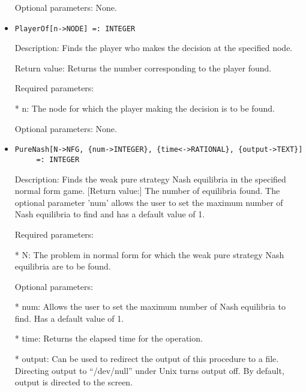 \begin{itemize}
\item
[Optional parameters:] None.
\ed

\item
\begin{verbatim}
PlayerOf[n->NODE] =: INTEGER
\end{verbatim}

\bd
\item
[Description:] Finds the player who makes the decision at the specified
node.
\item
[Return value:] Returns the number corresponding to the player found.
\item
[Required parameters:]\hfil\null

\bd
\item
[* n:] The node for which the player making the decision is to be
found.
\ed

\item
[Optional parameters:] None.
\ed

\item
\begin{verbatim}
PureNash[N->NFG, {num->INTEGER}, {time<->RATIONAL}, {output->TEXT}]
	 =: INTEGER
\end{verbatim}

\bd
\item
[Description:] Finds the weak pure strategy Nash equilibria in the 
specified normal form game.  
[Return value:] The number of equilibria found.  The optional parameter 
'num' allows the user to set the maximum number of Nash equilibria to 
find and has a default value of 1.
\item
[Required parameters:]\hfil\null
	
\bd
\item
[* N:] The problem in normal form for which the weak pure strategy
Nash equilibria are to be found.
\ed

\item
[Optional parameters:]\hfil\null
	
\bd
\item
[* num:] Allows the user to set the maximum number of Nash equilibria
to find.  Has a default value of 1.
\item
[* time:] Returns the elapsed time for the operation.
\item
[* output:] Can be used to redirect the output of this procedure to a
file.  Directing output to ``/dev/null'' under Unix turns 
output off.  By default, output is directed to the screen.  

\ed
\ed


\end{itemize}
